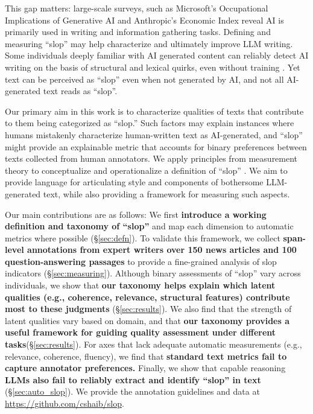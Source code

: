 \documentclass{article} %
\begin{document}
This gap matters: large-scale surveys, such as Microsoft's Occupational Implications of Generative AI \citep{tomlinson2025working} and Anthropic's Economic Index \citep{handa2025economic} reveal AI is primarily used in writing and information gathering tasks. Defining and measuring ``slop'' may help characterize and ultimately improve LLM writing. 
Some individuals deeply familiar with AI generated content can reliably detect AI writing on the basis of structural and lexical quirks, even without training \citep{chakrabarty2024art, Russell2025PeopleWF}. 
Yet text can be perceived as ``slop'' even when not generated by AI, and not all AI-generated text reads as ``slop''. 

Our primary aim in this work is to characterize qualities of texts that contribute to them being categorized as ``slop.'' Such factors may explain instances where humans mistakenly characterize human-written text as AI-generated, and ``slop'' might provide an explainable metric that accounts for binary preferences between texts collected from human annotators.  We apply principles from measurement theory to conceptualize and operationalize a definition of ``slop'' \citep{bandalos2018measurement}.  We aim to provide language for articulating style and components of bothersome LLM-generated text, while also providing a framework for measuring such aspects. 

Our main contributions are as follows: 
We first \textbf{introduce a working definition and taxonomy of ``slop''} and map each dimension to automatic metrics where possible (\S\ref{sec:defn}).
To validate this framework, we collect \textbf{span-level annotations from expert writers over 150 news articles and 100 question-answering passages} to provide a fine-grained analysis of slop indicators (\S\ref{sec:measuring}).
Although binary assessments of ``slop'' vary across individuals, we show that \textbf{our taxonomy helps explain which latent qualities (e.g., coherence, relevance, structural features) contribute most to these judgments} (\S\ref{sec:results}). 
We also find that the strength of latent qualities vary based on domain, and that \textbf{our taxonomy provides a useful framework for guiding quality assessment under different tasks}(\S\ref{sec:results}).
For axes that lack adequate automatic measurements (e.g., relevance, coherence, fluency), we find that \textbf{standard text metrics fail to capture annotator preferences. }
Finally, we show that capable reasoning \textbf{LLMs also fail to reliably extract and identify ``slop'' in text} (\S\ref{sec:auto_slop}).
We provide the annotation guidelines and data at \url{https://github.com/cshaib/slop}. 
\end{document}
